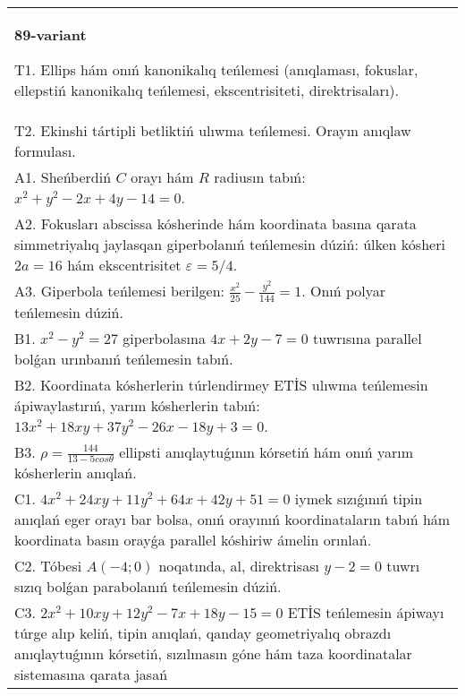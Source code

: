 \documentclass{article}
\begin{document}
\begin{tabular}{m{17cm}}
\textbf{89-variant}
\newline

T1. Ellips hám onıń kanonikalıq teńlemesi (anıqlaması, fokuslar, ellepstiń kanonikalıq teńlemesi, ekscentrisiteti, direktrisaları).\\

T2. Ekinshi tártipli betliktiń ulıwma teńlemesi. Orayın anıqlaw formulası.\\

A1. Sheńberdiń $C$ orayı hám $R$ radiusın tabıń: $x^2+y^2-2 x+4 y-14=0$.\\

A2. Fokusları abscissa kósherinde hám koordinata basına qarata simmetriyalıq jaylasqan giperbolanıń teńlemesin dúziń: úlken kósheri $2 a=16$ hám ekscentrisitet $\varepsilon=5/4$.\\

A3. Giperbola teńlemesi berilgen: $\frac{x^{2}}{25}-\frac{y^{2}}{144}=1$. Onıń polyar teńlemesin dúziń.\\

B1. $x^{2} - y^{2} = 27$ giperbolasına $4x + 2y - 7 = 0$ tuwrısına parallel bolǵan urınbanıń teńlemesin tabıń.  \\

B2. Koordinata kósherlerin túrlendirmey ETİS ulıwma teńlemesin ápiwaylastırıń, yarım kósherlerin tabıń: $13x^{2} + 18xy + 37y^{2} - 26x - 18y + 3 = 0$.  \\

B3. $\rho = \frac{144}{13 - 5cos\theta}$ ellipsti anıqlaytuǵının kórsetiń hám onıń yarım kósherlerin anıqlań.\\

C1. $4x^{2} + 24xy + 11y^{2} + 64x + 42y + 51 = 0$ iymek sızıǵınıń tipin anıqlań eger orayı bar bolsa, onıń orayınıń koordinataların tabıń hám koordinata basın orayǵa parallel kóshiriw ámelin orınlań.  \\

C2. Tóbesi $A(-4;0)$ noqatında, al, direktrisası $y - 2 = 0$ tuwrı sızıq bolǵan parabolanıń teńlemesin dúziń.\\

C3. $2x^{2} + 10xy + 12y^{2} - 7x + 18y - 15 = 0$ ETİS teńlemesin ápiwayı túrge alıp keliń, tipin anıqlań, qanday geometriyalıq obrazdı anıqlaytuǵının kórsetiń, sızılmasın góne hám taza koordinatalar sistemasına qarata jasań  \\

\end{tabular}
\vspace{1cm}
\end{document}
